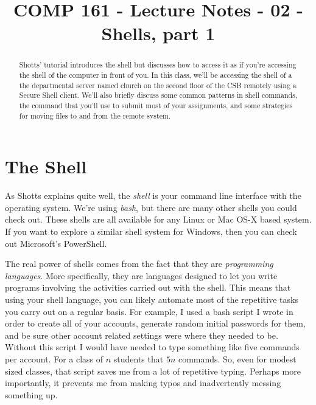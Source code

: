 \documentclass[]{tufte-handout}
\title{COMP 161 - Lecture Notes - 02 - Shells, part 1}
\begin{document}
\maketitle

\begin{abstract}
Shotts' tutorial introduces the shell but discusses how to access it as if you're accessing the shell of the computer in front of you.  In this class, we'll be accessing the shell of a the departmental server named church on the second floor of the CSB remotely using a Secure Shell client. We'll also briefly discuss some common patterns in shell commands, the command that you'll use to submit most of your assignments, and some strategies for moving files to and from the remote system. 
\end{abstract}

\section{The Shell}

As Shotts explains quite well, the \textit{shell} is your command line interface with the operating system.  We're using \textit{bash}, but there are many other shells you could check out.  These shells are all available for any Linux or Mac OS-X based system. If you want to explore a similar shell system for Windows, then you can check out Microsoft's PowerShell.    

The real power of shells comes from the fact that they are \textit{programming languages}.  More specifically, they are languages designed to let you write programs involving the activities carried out with the shell.  This means that using your shell language, you can likely automate most of the repetitive tasks you carry out on a regular basis.  For example, I used a bash script I wrote in order to create all of your accounts, generate random initial passwords for them, and be sure other account related settings were where they needed to be.  Without this script I would have needed to type something like five commands per account. For a class of $n$ students that $5n$ commands.  So, even for modest sized classes, that script saves me from a lot of repetitive typing. Perhaps more importantly, it prevents me from making typos and inadvertently messing something up. 
\end{document}
